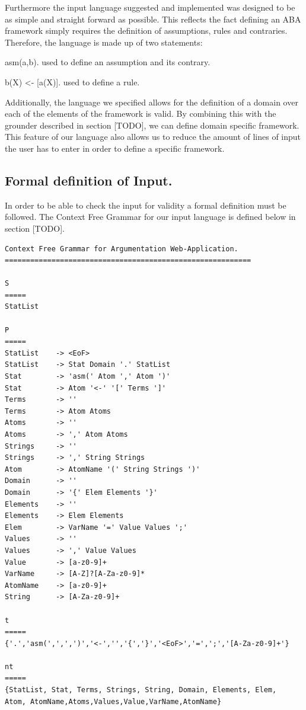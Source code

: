 Furthermore the input language suggested and implemented was designed to be as simple and straight forward as possible. This reflects the fact defining an ABA framework simply requires the definition of assumptions, rules and contraries. Therefore, the language is made up of two statements:

\begin{itemize*}
\item asm(a,b). used to define an assumption and its contrary.
\item b(X) \textless - [a(X)]. used to define a rule.
\end{itemize*}

Additionally, the language we specified allows for the definition of a domain over each of the elements of the framework is valid. By combining this with the grounder described in section [TODO], we can define domain specific framework. This feature of our language also allows us to reduce the amount of lines of input the user has to enter in order to define a specific framework.

\subsection{Formal definition of Input.}

In order to be able to check the input for validity a formal definition must be followed. The Context Free Grammar for our input language is defined below in section [TODO].

\begin{verbatim}
Context Free Grammar for Argumentation Web-Application.
==========================================================

S 
=====
StatList

P
=====
StatList	-> <EoF>
StatList	-> Stat Domain '.' StatList
Stat		-> 'asm(' Atom ',' Atom ')'
Stat		-> Atom '<-' '[' Terms ']'
Terms		-> ''
Terms		-> Atom Atoms
Atoms		-> ''
Atoms		-> ',' Atom Atoms
Strings		-> ''
Strings		-> ',' String Strings
Atom		-> AtomName '(' String Strings ')'
Domain		-> ''
Domain		-> '{' Elem Elements '}'
Elements	-> ''
Elements	-> Elem Elements
Elem		-> VarName '=' Value Values ';'
Values		-> ''
Values		-> ',' Value Values
Value		-> [a-z0-9]+
VarName		-> [A-Z]?[A-Za-z0-9]*
AtomName	-> [a-z0-9]+
String		-> [A-Za-z0-9]+

t
=====
{'.','asm(',',',')','<-','','{','}','<EoF>','=',';','[A-Za-z0-9]+'}

nt
=====
{StatList, Stat, Terms, Strings, String, Domain, Elements, Elem,
Atom, AtomName,Atoms,Values,Value,VarName,AtomName}
\end{verbatim}

